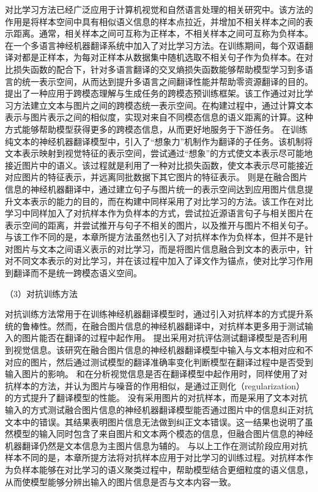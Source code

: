 对比学习方法已经广泛应用于计算机视觉和自然语言处理的相关研究中。该方法的作用是将样本空间中具有相似语义信息的样本点拉近，并增加不相关样本之间的表示距离。通常，相关样本之间可互称为正样本，不相关样本之间可互称为负样本。
在一个多语言神经机器翻译系统中加入了对比学习方法。在训练期间，每个双语翻译对都是正样本，为每对正样本从数据集中随机选取不相关句子作为负样本。在对比损失函数的配合下，针对多语言翻译的交叉熵损失函数能够帮助模型学习到多语言的统一表示空间，从而达到提升多语言之间翻译性能并帮助零资源翻译的目的。
提出了一种应用于跨模态理解与生成任务的跨模态预训练框架。该工作通过对比学习方法建立文本与图片之间的跨模态统一表示空间。在构建过程中，通过计算文本表示与图片表示之间的相似度，实现对来自不同模态信息的语义距离的计算。这种方式能够帮助模型获得更多的跨模态信息，从而更好地服务于下游任务。
在训练纯文本的神经机器翻译模型中，引入了“想象力”机制作为翻译的子任务。该机制将文本表示映射到视觉特征的表示空间，尝试通过“想象”的方式使文本表示尽可能地接近图片中的语义。该过程就是利用了一种对比损失函数，使文本表示尽可能接近对应图片的特征表示，并远离同批数据下其它图片的特征表示。
则是在融合图片信息的神经机器翻译中，通过建立句子与图片统一的表示空间达到应用图片信息提升文本表示的能力的目的，而在构建中同样采用了对比学习的方法。该工作在对比学习中同样加入了对抗样本作为负样本的方式，尝试拉近源语言句子与相关图片在表示空间的距离，并尝试推开与句子不相关的图片，以及推开与图片不相关句子。与该工作不同的是，本章所提方法虽然也引入了对抗样本作为负样本，但并不是针对图片与文本之间语义表示的对比学习，而是将图片信息融合到文本的表示中，针对不同文本表示的对比学习，并在该过程中加入了译文作为锚点，使对比学习作用到翻译而不是统一跨模态语义空间。

{\sffamily （3）对抗训练方法}

对抗训练方法常用于在训练神经机器翻译模型时，通过引入对抗样本的方式提升系统的鲁棒性。然而，在融合图片信息的神经机器翻译中，对抗样本更多用于测试输入的图片能否在翻译的过程中起作用。
提出采用对抗评估测试翻译模型是否利用到视觉信息。该研究在融合图片信息的神经机器翻译模型中输入与文本相对应和不对应的图片，然后通过测试模型的翻译准确率变化判断模型在翻译过程中是否受到输入图片的影响。
和在分析视觉信息是否在翻译模型中起作用时，同样使用了对抗样本的方法，并认为图片与噪音的作用相似，是通过正则化（regularization）的方式提升了翻译模型的性能。
没有采用图片的对抗样本，而是采用了文本对抗输入的方式测试融合图片信息的神经机器翻译模型能否通过图片中的信息纠正对抗文本中的错误。其结果表明图片信息无法做到纠正文本错误。这一结果也说明了虽然模型的输入同时包含了来自图片和文本两个模态的信息，但融合图片信息的神经机器翻译仍然是文本信息为主图片信息为辅的。
与以上工作在测试阶段应用对抗样本不同的是，本章所提方法将对抗样本应用于对比学习的训练过程。对抗样本作为负样本能够在对比学习的语义聚类过程中，帮助模型结合更细粒度的语义信息，从而使模型能够分辨出输入的图片信息是否与文本内容一致。